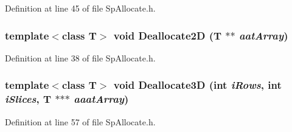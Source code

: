 Definition at line 45 of file Sp\-Allocate.h.
\subsubsection{\setlength{\rightskip}{0pt plus 5cm}template$<$class T$>$ void Deallocate2D (T $\ast$$\ast$ {\em aat\-Array})}\label{namespaceSpark_a33}


Definition at line 38 of file Sp\-Allocate.h.
\subsubsection{\setlength{\rightskip}{0pt plus 5cm}template$<$class T$>$ void Deallocate3D (int {\em i\-Rows}, int {\em i\-Slices}, T $\ast$$\ast$$\ast$ {\em aaat\-Array})}\label{namespaceSpark_a35}


Definition at line 57 of file Sp\-Allocate.h.